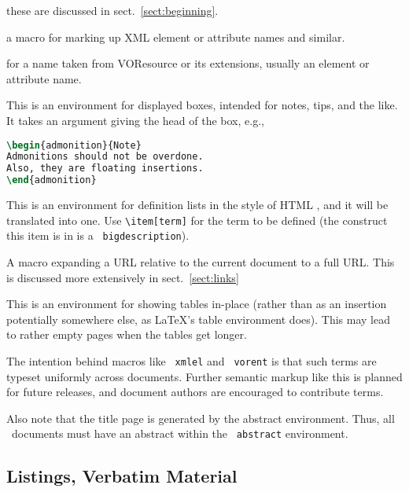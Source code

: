 \documentclass[11pt,a4paper]{ivoa}
\newcommand{\texword}[1]{\texttt{\color{texcolor} #1}}
\begin{document}
\begin{bigdescription}
\item[\texword{author}, \texword{previousversion}, \texword{ivoagroup}] these are discussed
in sect.~\ref{sect:beginning}.
\item[\texword{xmlel}] a macro for marking up XML element or attribute
names and similar.  
\item[\texword{vorent}] for a name taken from VOResource or its
extensions, usually an
element or attribute name.
\item[\texword{admonition}] This is an environment for 
displayed boxes, intended for notes, tips, and the like.  
It takes an argument giving the head of the box, e.g.,

\begin{lstlisting}[language=TeX]
\begin{admonition}{Note}
Admonitions should not be overdone.  
Also, they are floating insertions.
\end{admonition}
\end{lstlisting}
\item[\texword{bigdescription}] This is an environment for definition
lists in the style of HTML , and it will be translated into
one.  Use \verb|\item[term]| for the term to be defined
(the construct this item is in is a \texword{bigdescription}).
\item[\texword{auxilaryurl}] A macro expanding a URL relative to the
current document to a full URL.  This is discussed more extensively in
sect.~\ref{sect:links}
\item[\texword{inlinetable}] This is an environment for showing tables
in-place (rather than as an insertion potentially somewhere else, as
LaTeX's table environment does).  This may lead to rather empty pages
when the tables get longer.
\end{bigdescription}

The intention behind macros like \texword{xmlel} and \texword{vorent} is
that such terms are typeset uniformly across documents.  Further
semantic markup like this is planned for future releases, and document
authors are encouraged to contribute terms.

Also note that the title page is generated by the abstract environment.
Thus, all \ivoatex\ documents must have an abstract within the
\texword{abstract} environment.

\subsection{Listings, Verbatim Material}
\end{document}

